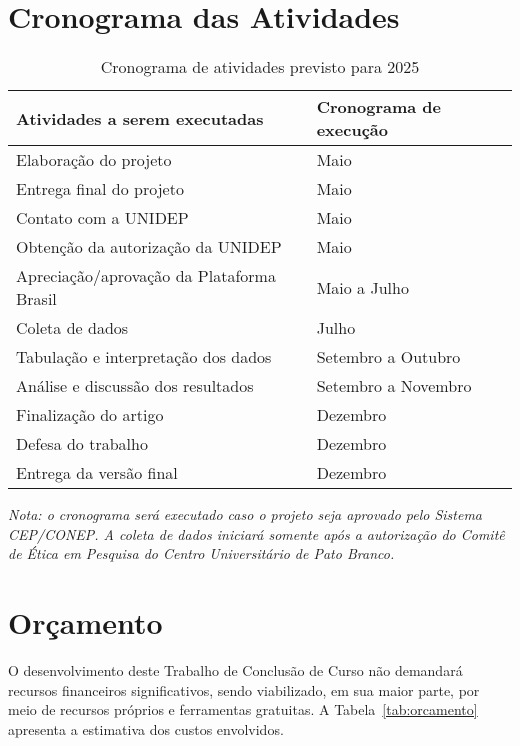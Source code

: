 \documentclass[openright]{normas-utf-tex}
\begin{document}
\section{Cronograma das Atividades}
\label{sec:cronograma}

\begin{table}[H]
    \centering
    \caption{Cronograma de atividades previsto para 2025}
    \label{tab:cronograma}
    \begin{tabular}{p{6cm}p{7.5cm}}
        \toprule
        Atividades a serem executadas & Cronograma de execução \\
        \midrule
        Elaboração do projeto & Maio \\
        Entrega final do projeto & Maio \\
        Contato com a UNIDEP & Maio \\
        Obtenção da autorização da UNIDEP & Maio \\
        Apreciação/aprovação da Plataforma Brasil & Maio a Julho \\
        Coleta de dados & Julho \\
        Tabulação e interpretação dos dados & Setembro a Outubro \\
        Análise e discussão dos resultados & Setembro a Novembro \\
        Finalização do artigo & Dezembro \\
        Defesa do trabalho & Dezembro \\
        Entrega da versão final & Dezembro \\
        \bottomrule
    \end{tabular}
    \vspace{0.5em}
\end{table}

\noindent\textit{Nota: o cronograma será executado caso o projeto seja aprovado pelo Sistema CEP/CONEP. A coleta de dados iniciará somente após a autorização do Comitê de Ética em Pesquisa do Centro Universitário de Pato Branco.}

\section{Orçamento}
\label{sec:orcamento}

O desenvolvimento deste Trabalho de Conclusão de Curso não demandará recursos financeiros significativos, sendo viabilizado, em sua maior parte, por meio de recursos próprios e ferramentas gratuitas. A Tabela~\ref{tab:orcamento} apresenta a estimativa dos custos envolvidos.
\end{document}
